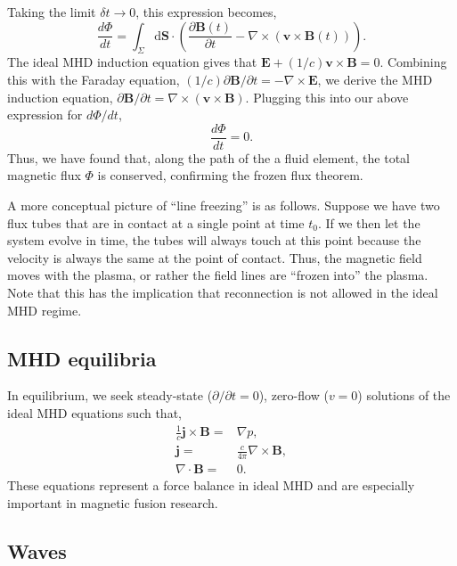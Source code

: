 	Taking the limit $\delta t\to0$, this expression becomes,
	\begin{equation}
		\frac{d\Phi}{d t} = \int_{\Sigma}\mathrm{d}\mathbf{S}\cdot\left(\frac{\partial\mathbf{B}(t)}{\partial t} - \nabla\times(\mathbf{v}\times\mathbf{B}(t))\right).
	\end{equation}
	The ideal MHD induction equation gives that $\mathbf{E} + (1/c)\mathbf{v}\times\mathbf{B}=0$. Combining this with the Faraday equation, $(1/c)\partial\mathbf{B}/\partial t=-\nabla\times\mathbf{E}$, we derive the MHD induction equation, $\partial\mathbf{B}/\partial t=\nabla\times(\mathbf{v}\times\mathbf{B})$. Plugging this into our above expression for $d\Phi/dt$, 
	\begin{equation}
		\frac{d\Phi}{dt} = 0.
	\end{equation}
	Thus, we have found that, along the path of the a fluid element, the total magnetic flux $\Phi$ is conserved, confirming the frozen flux theorem.

	A more conceptual picture of ``line freezing'' is as follows. Suppose we have two flux tubes that are in contact at a single point at time $t_0$. If we then let the system evolve in time, the tubes will always touch at this point because the velocity is always the same at the point of contact. Thus, the magnetic field moves with the plasma, or rather the field lines are ``frozen into'' the plasma. Note that this has the implication that reconnection is not allowed in the ideal MHD regime.

	\subsection{MHD equilibria}

	In equilibrium, we seek steady-state ($\partial/\partial t=0$), zero-flow ($v=0$) solutions of the ideal MHD equations such that,
	\begin{align}
		\frac{1}{c}\mathbf{j}\times\mathbf{B} =& \nabla p, \\
		\mathbf{j} =& \frac{c}{4\pi}\nabla\times\mathbf{B}, \\
		\nabla\cdot\mathbf{B} =& 0.
	\end{align}
	These equations represent a force balance in ideal MHD and are especially important in magnetic fusion research.

	\subsection{Waves}

